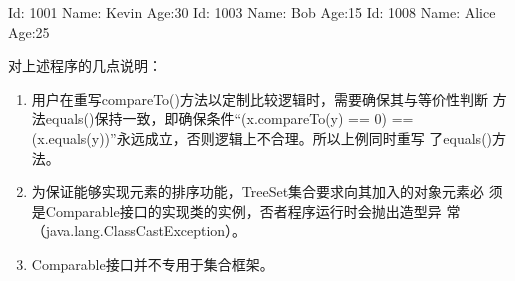 \begin{stdoutCode}
  Id: 1001 Name: Kevin Age:30
  Id: 1003 Name: Bob Age:15
  Id: 1008 Name: Alice Age:25
\end{stdoutCode}

对上述程序的几点说明：

\begin{enumerate}
\item 用户在重写compareTo()方法以定制比较逻辑时，需要确保其与等价性判断
  方法equals()保持一致，即确保条件“{\Red (x.compareTo(y) == 0) ==
    (x.equals(y))}”永远成立，否则逻辑上不合理。所以上例同时重写
  了equals()方法。
\item 为保证能够实现元素的排序功能，TreeSet集合要求向其加入的对象元素必
  须是Comparable接口的实现类的实例，否者程序运行时会抛出{\Red 造型异
    常}（java.lang.ClassCastException）。
\item Comparable接口并不专用于集合框架。
\end{enumerate}

